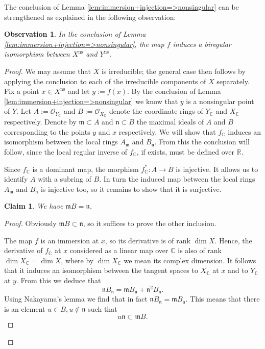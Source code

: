 \documentclass{amsart}
\theoremstyle{plain}
\newtheorem{obs}[thm]{Observation}
\newtheorem*{claim*}{Claim}
\theoremstyle{definition}
\theoremstyle{remark}
\numberwithin{equation}{thm} %
\newcommand{\R}{\mathbb{R}}
\newcommand{\C}{\mathbb{C}}
\newcommand{\ns}{\mathrm{ns}}
\newcommand{\OO}{\mathcal{O}}
\begin{document}
The conclusion of Lemma \ref{lem:immersion+injection=>nonsingular} can be strengthened as explained in the following observation:
\begin{obs}\label{obs:strengthening}
In the conclusion of Lemma \ref{lem:immersion+injection=>nonsingular}, the map $f$ induces a biregular isomorphism between $X^\ns$ and $Y^\ns$.
\end{obs}
\begin{proof}
We may assume that $X$ is irreducible; the general case then follows by applying the conclusion to each of the irreducible components of $X$ separately. Fix a point $x\in X^\ns$ and let $y:=f(x)$. By the conclusion of Lemma \ref{lem:immersion+injection=>nonsingular} we know that $y$ is a nonsingular point of $Y$. Let $A:=\OO_{Y_\C}$ and $B:=\OO_{X_\C}$ denote the coordinate rings of $Y_\C$ and $X_\C$ respectively. Denote by $\mathfrak m\subset A$ and $\mathfrak n\subset B$ the maximal ideals of $A$ and $B$ corresponding to the points $y$ and $x$ respectively.  We will show that $f_\C$ induces an isomorphism between the local rings $A_{\mathfrak m}$ and $B_{\mathfrak n}$. From this the conclusion will follow, since the local regular inverse of $f_\C$, if exists, must be defined over $\R$.

Since $f_\C$ is a dominant map, the morphism $f_\C^\ast:A\rightarrow B$ is injective. It allows us to identify $A$ with a subring of $B$. In turn the induced map between the local rings $A_{\mathfrak m}$ and $B_{\mathfrak n}$ is injective too, so it remains to show that it is surjective.
\begin{claim*}
We have $\mathfrak mB=\mathfrak n$.
\end{claim*}
\begin{proof}
Obviously $\mathfrak mB\subset\mathfrak n$, so it suffices to prove the other inclusion.

The map $f$ is an immersion at $x$, so its derivative is of rank $\dim X$. Hence, the derivative of $f_\C$ at $x$ considered as a linear map over $\C$ is also of rank $\dim X_\C=\dim X$, where by $\dim X_\C$ we mean its complex dimension. It follows that it induces an isomorphism between the tangent spaces to $X_\C$ at $x$ and to $Y_\C$ at $y$. From this we deduce that
\begin{equation*}
    \mathfrak nB_{\mathfrak n}=\mathfrak m B_{\mathfrak n}+\mathfrak n^2B_{\mathfrak n}.
\end{equation*}
Using Nakayama's lemma we find that in fact $\mathfrak nB_{\mathfrak n}=\mathfrak m B_{\mathfrak n}$. This means that there is an element $u\in B,u\not \in \mathfrak n$ such that 
\begin{equation}\label{eq:obsProof1}
    u\mathfrak n\subset \mathfrak mB.    
\end{equation}


\end{proof}
\end{proof}
\end{document}
